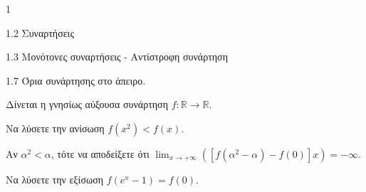 \begin{ylh}{1}
    \item 1.2 Συναρτήσεις
    \item 1.3 Μονότονες συναρτήσεις - Αντίστροφη συνάρτηση
    \item 1.7 Όρια συνάρτησης στο άπειρο.
\end{ylh}
Δίνεται η γνησίως αύξουσα συνάρτηση $f: \mathbb{R} \to \mathbb{R}$.
\begin{alist}
\item Να λύσετε την ανίσωση $f(x^2) < f(x)$. 
\item Αν $\alpha^2 < \alpha$, τότε να αποδείξετε ότι $\lim_{x \to +\infty} ([f(\alpha^2 - \alpha) - f(0)] x) = -\infty$. 
\item Να λύσετε την εξίσωση $f(e^x - 1) = f(0)$. 
\end{alist}